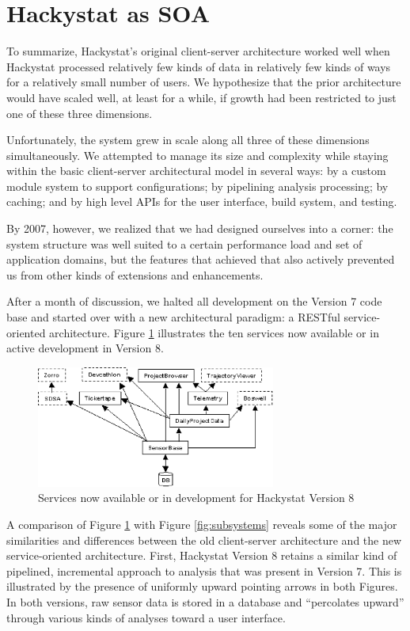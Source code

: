\documentclass[conference,compsoc,peerreview]{IEEEtran}
\begin{document}
\section{Hackystat as SOA}
\label{sec:soa}

To summarize, Hackystat's original client-server architecture worked well
when Hackystat processed relatively few kinds of data in relatively few
kinds of ways for a relatively small number of users.  We hypothesize that
the prior architecture would have scaled well, at least for a while, if
growth had been restricted to just one of these three dimensions.

Unfortunately, the system grew in scale along all three of these dimensions
simultaneously.  We attempted to manage its size and complexity while
staying within the basic client-server architectural model in several ways:
by a custom module system to support configurations; by pipelining analysis
processing; by caching; and by high level APIs for the user interface,
build system, and testing.

By 2007, however, we realized that we had designed ourselves into a
corner: the system structure was well suited to a certain performance
load and set of application domains, but the features that achieved that
also actively prevented us from other kinds of extensions and enhancements.

After a month of discussion, we halted all development on the Version 7
code base and started over with a new architectural paradigm: a RESTful
service-oriented architecture.  Figure \ref{fig:soa} illustrates the
ten services now available or in active development in Version 8.

\begin{figure}[ht]
  \center
  \includegraphics[width=0.7\textwidth]{soa.eps}
  \caption{Services now available or in development for Hackystat Version 8}
  \label{fig:soa}
\end{figure} 

A comparison of Figure \ref{fig:soa} with Figure \ref{fig:subsystems}
reveals some of the major similarities and differences between the old
client-server architecture and the new service-oriented architecture.
First, Hackystat Version 8 retains a similar kind of pipelined, incremental
approach to analysis that was present in Version 7. This is illustrated by
the presence of uniformly upward pointing arrows in both Figures.  In both
versions, raw sensor data is stored in a database and ``percolates upward''
through various kinds of analyses toward a user interface.
\end{document}
